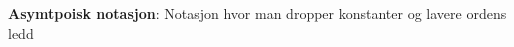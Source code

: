 \documentclass[12pt]{report}
\begin{document}
\vspace{\baselineskip}

\vspace{\baselineskip}

\vspace{\baselineskip}

\vspace{\baselineskip}

\vspace{\baselineskip}
\textbf{Asymtpoisk notasjon}: Notasjon hvor man dropper konstanter og lavere ordens ledd\par


\vspace{\baselineskip}


\end{document}
